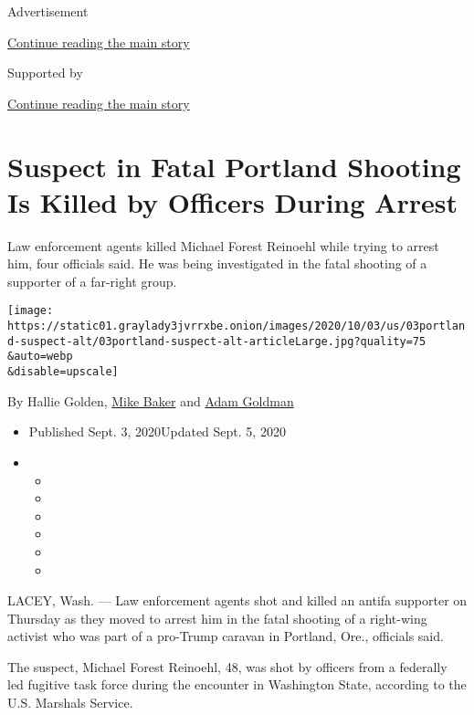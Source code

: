 Advertisement

\protect\hyperlink{after-top}{Continue reading the main story}

Supported by

\protect\hyperlink{after-sponsor}{Continue reading the main story}

\hypertarget{suspect-in-fatal-portland-shooting-is-killed-by-officers-during-arrest}{%
\section{Suspect in Fatal Portland Shooting Is Killed by Officers During
Arrest}\label{suspect-in-fatal-portland-shooting-is-killed-by-officers-during-arrest}}

Law enforcement agents killed Michael Forest Reinoehl while trying to
arrest him, four officials said. He was being investigated in the fatal
shooting of a supporter of a far-right group.

\texttt{[image: https://static01.graylady3jvrrxbe.onion/images/2020/10/03/us/03portland-suspect-alt/03portland-suspect-alt-articleLarge.jpg?quality=75\\\&auto=webp\\\&disable=upscale]}

By Hallie Golden,
\href{https://www.nytimes3xbfgragh.onion/by/mike-baker}{Mike Baker} and
\href{https://www.nytimes3xbfgragh.onion/by/adam-goldman}{Adam Goldman}

\begin{itemize}
\item
  Published Sept. 3, 2020Updated Sept. 5, 2020
\item
  \begin{itemize}
  \item
  \item
  \item
  \item
  \item
  \item
  \end{itemize}
\end{itemize}

LACEY, Wash. --- Law enforcement agents shot and killed an antifa
supporter on Thursday as they moved to arrest him in the fatal shooting
of a right-wing activist who was part of a pro-Trump caravan in
Portland, Ore., officials said.

The suspect, Michael Forest Reinoehl, 48, was shot by officers from a
federally led fugitive task force during the encounter in Washington
State, according to the U.S. Marshals Service.

